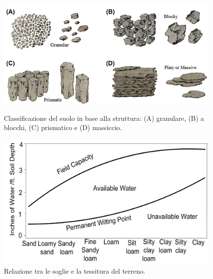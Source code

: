 \documentclass[12pt,a4paper,openright,twoside, openany]{book}
\begin{document}
\begin{figure}[ht]
    \centering
    \begin{minipage}[t]{0.5\textwidth}
        \vfill
        \includegraphics[width=\linewidth]{../figures/soil-structure.png}
        \caption{Classificazione del suolo in base alla struttura: (A) granulare, (B) a blocchi, (C) prismatico e (D) massiccio\cite{RAI2017505}.}
        \label{fig.soil-structure}
    \end{minipage}
    \hfill
    \begin{minipage}[t]{0.45\textwidth}
        \vfill
        \includegraphics[width=\linewidth]{../figures/SWC-costants-in-different-soils.png}
        \caption{Relazione tra le soglie e la tessitura del terreno\cite{Ding2022}.}
        \label{fig.SWC-costants-in-different-soils}
    \end{minipage}
\end{figure}
\end{document}

